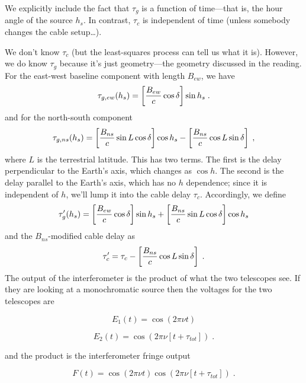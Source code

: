 \documentclass[11pt,preprint]{aastex}
\begin{document}
\noindent We explicitly include the fact that $\tau_g$ is a function of
time---that is, the hour angle of the source $h_s$. In contrast, $\tau_c$ is
independent of time (unless somebody changes the cable setup\dots).

	We don't know $\tau_c$ (but the least-squares process can tell
us what it is).  However, we do know $\tau_g$ because it's just
geometry---the geometry discussed in the reading.  For the east-west
baseline component with length $B_{ew}$, we have
%
\begin{equation}
 \tau_{g, ew}(h_s) = \left[{B_{ew} \over c} \cos \delta \right] \sin h_s \; . 
\end{equation}
%
and for the north-south component
%
\begin{equation}
 \tau_{g,ns}(h_s) = \left[{B_{ns} \over c} \sin L \cos \delta \right] \cos h_s
 - \left[{B_{ns} \over c} \cos L \sin \delta \right]  \; , 
\end{equation}
%
where $L$ is the terrestrial latitude. This  has two terms. The first is
the delay perpendicular to the Earth's axis, which changes as $\cos h$.
The second is the delay parallel to the Earth's axis, which has no $h$
dependence; since it is independent of $h$, we'll lump it into the cable
delay $\tau_c$. Accordingly, we define
%
\begin{equation}
\tau_g'(h_s) = \left[{B_{ew} \over c} \cos \delta \right] \sin h_s 
  + \left[{B_{ns} \over c} \sin L \cos \delta \right] \cos h_s
\end{equation}
%
and the $B_{ns}$-modified cable delay as
%
\begin{equation}
\tau_c' = \tau_c  - \left[{B_{ns} \over c} \cos L \sin \delta \right]  \; . 
\end{equation}
%
	The output of the interferometer is the product of what the two
telescopes see. If they are looking at a monochromatic source then the
voltages for the two telescopes are

\begin{equation}
 E_1(t) = \cos (2 \pi \nu t) 
\end{equation}


\begin{equation}
 E_2(t) = \cos (2 \pi \nu [t + \tau_{tot}]) \; . 
\end{equation}


\noindent and the product is the interferometer fringe output

\begin{equation}
 F(t) = \cos (2 \pi \nu t) \cos (2 \pi \nu [t + \tau_{tot}]) \; . 
\end{equation}
\end{document}
